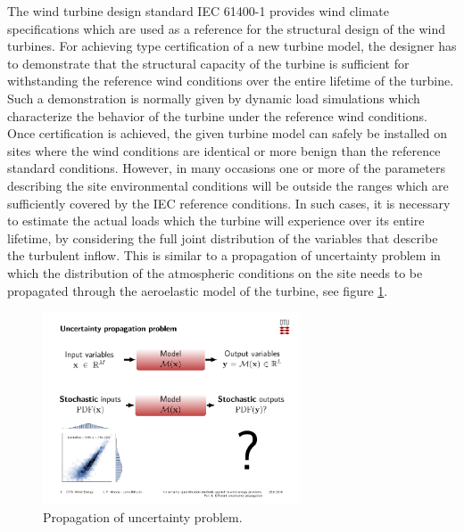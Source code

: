 \documentclass[preprint,12pt]{elsarticle}
\begin{document}
The wind turbine design standard IEC 61400-1 \cite{international2005iec} provides wind climate specifications which are used as a reference for the structural design of the wind turbines. For achieving type certification of a new turbine model, the designer has to demonstrate that the structural capacity of the turbine is sufficient for withstanding the reference wind conditions over the entire lifetime of the turbine. Such a demonstration is normally given by dynamic load simulations which characterize the behavior of the turbine under the reference wind conditions. Once certification is achieved, the given turbine model can safely be installed on sites where the wind conditions are identical or more benign than the reference standard conditions. However, in many occasions one or more of the parameters describing the site environmental conditions will be outside the ranges which are sufficiently covered by the IEC reference conditions. In such cases, it is necessary to estimate the actual loads which the turbine will experience over its entire lifetime, by considering the full joint distribution of the variables that describe the turbulent inflow. This is similar to a propagation of uncertainty problem in which the distribution of the atmospheric conditions on the site needs to be propagated through the aeroelastic model of the turbine, see figure \ref{fig_0_propagation}. 

\begin{figure}[h!]
\begin{centering}
\includegraphics[width=3.0in]{Figures/0_problem_statement.pdf}
\caption{Propagation of uncertainty problem.}
\label{fig_0_propagation}
\end{centering}
\end{figure}
\end{document}
